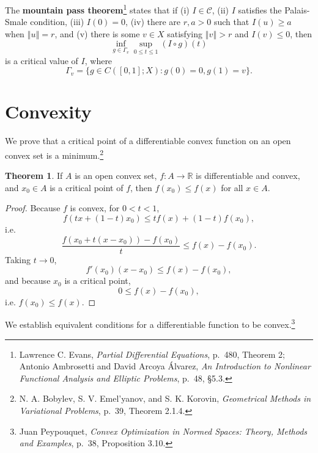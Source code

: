 \documentclass{article}
\newcommand{\norm}[1]{\left\Vert #1 \right\Vert}
\theoremstyle{definition}
\newtheorem{theorem}{Theorem}
\theoremstyle{definition}
\begin{document}
The \textbf{mountain pass theorem}\footnote{Lawrence C. Evans, {\em Partial Differential Equations},
p.~480, Theorem 2;
Antonio Ambrosetti and David Arcoya Álvarez, {\em An Introduction to Nonlinear Functional Analysis and Elliptic Problems},
p.~48, \S 5.3.}
states that if (i) $I \in \mathcal{C}$, (ii) $I$ satisfies the Palais-Smale condition, (iii) $I(0)=0$,
(iv) there are $r,a>0$ such that $I(u) \geq a$ when $\norm{u}=r$, and (v) there is some $v \in X$ satisfying
$\norm{v} > r$ and $I(v) \leq 0$, then 
\[
\inf_{g \in \Gamma_v} \sup_{0 \leq t \leq 1} (I \circ g)(t)
\]
is a critical value of $I$, where
\[
\Gamma_v=\{g \in C([0,1];X) : g(0)=0, g(1)=v\}.
\]




\section{Convexity}
We prove that a critical point of a  differentiable convex function on an open convex set is a minimum.\footnote{N. A. Bobylev, S. V. Emel'yanov, and S. K. Korovin, {\em Geometrical Methods in Variational Problems}, p.~39, Theorem 2.1.4.}

\begin{theorem}
If $A$ is an open convex set, $f:A \to \mathbb{R}$ is differentiable and convex, and $x_0 \in A$ is a critical point of $f$, then
$f(x_0) \leq f(x)$ for all $x \in A$.
\label{minimum}
\end{theorem}
\begin{proof}
Because $f$ is convex, for $0<t<1$,
\[
f(tx+(1-t)x_0) \leq tf(x)+(1-t)f(x_0),
\]
i.e.
\[
\frac{f(x_0+t(x-x_0)) - f(x_0)}{t} \leq f(x)-f(x_0).
\]
Taking $t \to 0$,
\[
f'(x_0)(x-x_0) \leq f(x)-f(x_0),
\]
and because $x_0$ is a critical point,
\[
0 \leq f(x)-f(x_0),
\]
i.e. $f(x_0) \leq f(x)$. 
\end{proof}


We establish equivalent conditions for a  differentiable function to be convex.\footnote{Juan Peypouquet,
{\em Convex Optimization in Normed Spaces: Theory, Methods and Examples}, p.~38, Proposition 3.10.}
\end{document}
